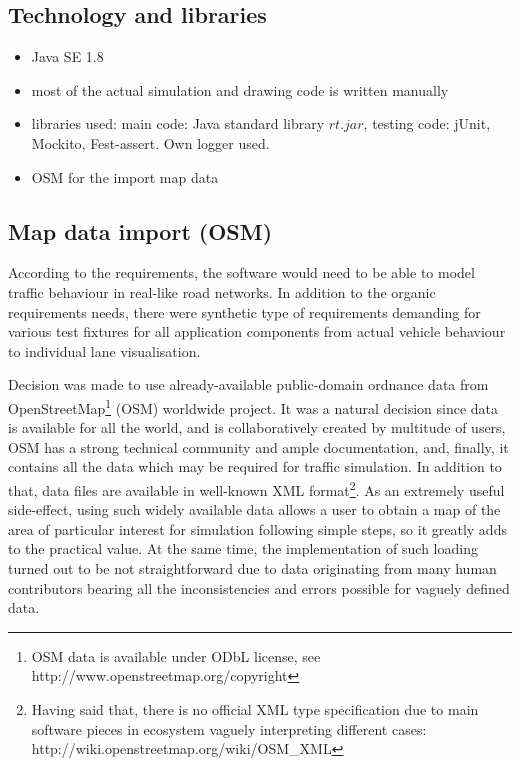 \subsection{Technology and libraries}
\begin{itemize}
    \item Java SE 1.8
    \item most of the actual simulation and drawing code is written manually
    \item libraries used: main code: Java standard library \(rt.jar\), testing code: jUnit, Mockito, Fest-assert. Own logger used.
    \item OSM for the import map data
\end{itemize}

\subsection{Map data import (OSM)}
According to the requirements, the software would need to be able to model traffic behaviour in real-like road networks. In addition to the organic requirements needs, there were synthetic type of requirements demanding for various test fixtures for all application components from actual vehicle behaviour to individual lane visualisation.

Decision was made to use already-available public-domain ordnance data from OpenStreetMap\footnote{OSM data is available under ODbL license, see http://www.openstreetmap.org/copyright} (OSM)  worldwide project. It was a natural decision since data is available for all the world, and is collaboratively created by multitude of users, OSM has a strong technical community and ample documentation, and, finally, it contains all the data which may be required for traffic simulation. In addition to that, data files are available in well-known XML format\footnote{Having said that, there is no official XML type specification due to main software pieces in ecosystem vaguely interpreting different cases: http://wiki.openstreetmap.org/wiki/OSM\_XML}. As an extremely useful side-effect, using such widely available data allows a user to obtain a map of the area of particular interest for simulation following simple steps, so it greatly adds to the practical value. At the same time, the implementation of such loading turned out to be not straightforward due to data originating from many human contributors bearing all the inconsistencies and errors possible for vaguely defined data.

